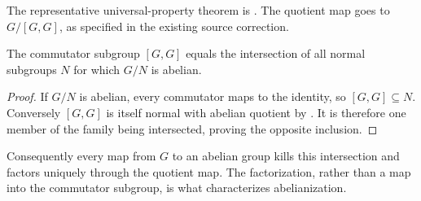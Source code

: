The representative universal-property theorem is
. The quotient map goes
to $G/[G,G]$, as specified in the existing source correction.

\begin{proposition}\label{abelianization-intersection}
The commutator subgroup $[G,G]$ equals the intersection of all normal
subgroups $N$ for which $G/N$ is abelian.
\end{proposition}
\begin{proof}\label{abelianization-intersection-proof}
If $G/N$ is abelian, every commutator maps to the identity, so
$[G,G]\subseteq N$. Conversely $[G,G]$ is itself normal with abelian
quotient by .
It is therefore one member of the family being intersected, proving
the opposite inclusion.
\end{proof}
\begin{remark}\label{abelianization-maps}
Consequently every map from $G$ to an abelian group kills this
intersection and factors uniquely through the quotient map.
The factorization, rather than a map into the commutator subgroup,
is what characterizes abelianization.
\end{remark}
